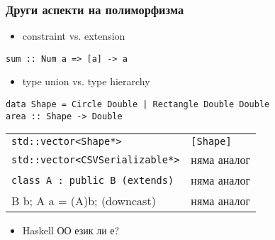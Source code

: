 \documentclass{beamer}
\begin{document}
\begin{frame}[fragile]
\frametitle{Други аспекти на полиморфизма}

\begin{itemize}
  \item constraint vs. extension
\end{itemize}
\begin{lstlisting}[basicstyle=\small]
sum :: Num a => [a] -> a  
\end{lstlisting}

\begin{itemize}
  \item type union vs. type hierarchy
\end{itemize}
\begin{lstlisting}[basicstyle=\small]
data Shape = Circle Double | Rectangle Double Double
area :: Shape -> Double
\end{lstlisting}

\begin{center}  
    \begin{tabular}{l | l}
      \verb|std::vector<Shape*>| & \verb|[Shape]| 
      \\ 
      \verb|std::vector<CSVSerializable*>| & няма аналог
      \\
      \verb|class A : public B (extends)| & няма аналог  
      \\
      B b; A a = (A)b; (downcast) & няма аналог
      
    \end{tabular}

\begin{itemize}
  \item Haskell ОО език ли е?
\end{itemize}

\end{center}



\end{frame}




\end{document}
